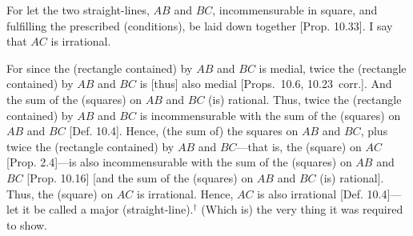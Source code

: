 \begin{Parallel}{}{}
{\epsfysize=0.3in
\centerline{}

For let the two straight-lines, $AB$ and $BC$,  incommensurable
in square, and fulfilling  the  prescribed (conditions), be laid down together [Prop. 10.33]. I say that $AC$ is irrational.

For since the (rectangle contained) by $AB$ and $BC$ is medial, twice
the (rectangle contained) by $AB$ and $BC$ is [thus] also medial [Props.~10.6, 10.23~corr.].
And the sum of the (squares) on $AB$ and $BC$ (is) rational. Thus, twice
the (rectangle contained) by $AB$ and $BC$ is incommensurable with the
sum of the (squares) on $AB$ and $BC$ [Def. 10.4].
Hence, (the sum of) the squares on $AB$ and $BC$, plus twice the
(rectangle contained) by $AB$ and $BC$---that is, the (square) on $AC$ [Prop. 2.4]---is also
incommensurable with the sum of the (squares) on $AB$ and $BC$
[Prop. 10.16] [and the
sum of the (squares) on $AB$ and $BC$ (is) rational]. Thus, the (square) on $AC$ is irrational. Hence, $AC$ is also irrational [Def. 10.4]---let it be called a major (straight-line).$^\dag$ (Which is) the
very thing it was required to show.}
\end{Parallel}



